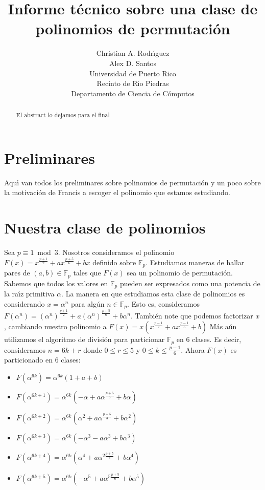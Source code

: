\documentclass[12pt]{article}
\title{Informe t\'ecnico sobre una clase de polinomios de permutaci\'on}
\author{Christian A. Rodr\'{\i}guez \\ Alex D. Santos \\ Universidad de Puerto Rico \\ Recinto de R\'{\i}o Piedras \\ Departamento de Ciencia de C\'omputos}
\date{}
\begin{document}
\maketitle

\begin{abstract}

El abstract lo dejamos para el final

\end{abstract}

\section{Preliminares}\label{intro}

Aqu\'{\i} van todos los preliminares sobre polinomios de permutación y un poco sobre la motivación de Francis a escoger el polinomio que estamos estudiando.

\section{Nuestra clase de polinomios}\label{pp}

Sea $p \equiv 1 \bmod{3}$. Nosotros consideramos el polinomio $ F(x) = x^{\frac{p+1}{2}} + ax^{\frac{p+5}{6}} + bx $ definido sobre $\mathbb{F}_{p}$. Estudiamos maneras de hallar pares de $(a,b) \in \mathbb{F}_{p}$ tales que $F(x)$ sea un polinomio de permutaci\'on. Sabemos que todos los valores en $\mathbb{F}_{p}$ pueden ser expresados como una potencia de la ra\'{\i}z primitiva $\alpha$. La manera en que estudiamos esta clase de polinomios es considerando $x=\alpha^{n}$ para alg\'un $n \in \mathbb{F}_{p}$. Esto es, consideramos $ F(\alpha^{n}) = (\alpha^{n})^{\frac{p+1}{2}} + a(\alpha^{n})^{\frac{p+5}{6}} + b\alpha^{n} $. Tambi\'en note que podemos factorizar $x$, cambiando nuestro polinomio a $F(x) = x(x^{\frac{p-1}{2}}+ax^{\frac{p-1}{6}}+b)$ M\'as a\'un utilizamos el algoritmo de divisi\'on para particionar $\mathbb{F}_{p}$ en $6$ clases. Es decir, consideramos $n = 6k+r$ donde $0 \leq r \leq 5$ y $0 \leq k \leq \frac{p-1}{6}$. Ahora $F(x)$ es particionado en $6$ clases:

\begin{itemize}
	\item
		$F(\alpha^{6k}) = \alpha^{6k}(1+a+b)$
	\item
		$F(\alpha^{6k+1})= \alpha^{6k}(-\alpha+a\alpha^{\frac{p+5}{6}}+b\alpha)$
	\item
		$F(\alpha^{6k+2})=\alpha^{6k}(\alpha^{2}+a\alpha^{\frac{p+5}{3}}+b\alpha^{2})$
	\item
		$F(\alpha^{6k+3})=\alpha^{6k}(-\alpha^{3}-a\alpha^{3}+b\alpha^{3})$
	\item
		$F(\alpha^{6k+4})=\alpha^{6k}(\alpha^{4}+a\alpha^{2\frac{p+5}{3}}+b\alpha^{4})$
	\item
		$F(\alpha^{6k+5})=\alpha^{6k}(-\alpha^{5}+a\alpha^{5\frac{p+5}{6}}+b\alpha^{5})$ 
\end{itemize}
\end{document}
